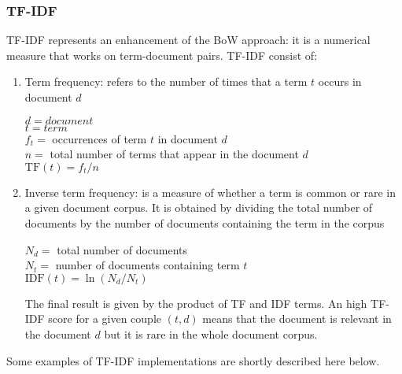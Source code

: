 \documentclass[\main/main.tex]{subfiles}
\begin{document}
\subsubsection{TF-IDF}
TF-IDF represents an enhancement of the BoW approach: it is a numerical measure that works on term-document pairs. TF-IDF consist of:
\begin{enumerate}
    \item Term frequency: refers to the number of times that a term $t$ occurs in document $d$
    \begin{center}
        $d=document$\\
        $t=term$\\
        $f_t=$  occurrences of term $t$ in document $d$\\
        $n =$ total number of terms that appear in the document $d$ \\
        $\mathrm{TF}(t) = f_t / n$
    \end{center}
    \item Inverse term frequency: is a measure of whether a term is common or rare in a given document corpus. It is obtained by dividing the total number of documents by the number of documents containing the term in the corpus \cite{NETTLETON2014171}
    \begin{center}
        $N_d = $ total number of documents\\
        $N_t = $ number of documents containing term $t$\\
        $\mathrm{IDF}(t) = \ln(N_d/N_t)$
    \end{center}
    The final result is given by the product of TF and IDF terms. An high TF-IDF score for a given couple $(t, d)$ means that the document is relevant in the document $d$ but it is rare in the whole document corpus.
\end{enumerate}
Some examples of TF-IDF implementations are shortly described here below.
\end{document}
